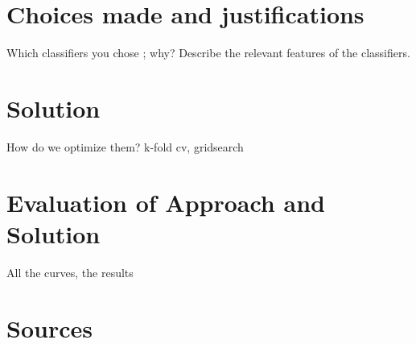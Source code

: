 \documentclass{article}
\begin{document}
\newpage



\section{Choices made and justifications}
Which classifiers you chose ; why?  
Describe the relevant features of the classifiers.

\newpage

\newpage

\section{Solution}
How do we optimize them? k-fold cv, gridsearch
\newpage

\section{Evaluation of Approach and Solution} 
All the curves, the results

\newpage

\section{Sources}
\end{document}
